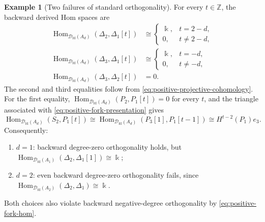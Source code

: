 \documentclass[11pt,a4paper]{article}
\newcommand{\D}{\mathcal D}
\newcommand{\ZZ}{\mathbb{Z}}
\newcommand{\std}{\Delta}
\DeclareMathOperator{\fd}{fd}
\DeclareMathOperator{\Hom}{Hom}
\theoremstyle{plain}
\theoremstyle{definition}
\newtheorem{example}[theorem]{Example}
\numberwithin{equation}{section}
\begin{document}
\begin{example}[Two failures of standard orthogonality]
For every $t\in\ZZ$, the backward derived Hom spaces are
\begin{equation}\label{eq:positive-fork-hom}
 \begin{aligned}
 \Hom_{\D_{\fd}(A_d)}(\std_2,\std_1[t])
   &\cong\begin{cases}\Bbbk,&t=2-d,\\0,&t\neq2-d,\end{cases}\\
 \Hom_{\D_{\fd}(A_d)}(\std_3,\std_1[t])
   &\cong\begin{cases}\Bbbk,&t=-d,\\0,&t\neq-d,\end{cases}\\
 \Hom_{\D_{\fd}(A_d)}(\std_3,\std_2[t])&=0.
 \end{aligned}
\end{equation}
The second and third equalities follow from
\eqref{eq:positive-projective-cohomology}. For the first equality,
$\Hom_{\D_{\fd}(A_d)}(P_2,P_1[t])=0$ for every $t$, and the triangle
associated with \eqref{eq:positive-fork-presentation} gives
\begin{equation}\label{eq:positive-fork-calculation}
 \Hom_{\D_{\fd}(A_d)}(S_2,P_1[t])
 \cong\Hom_{\D_{\fd}(A_d)}(P_3[1],P_1[t-1])
 \cong H^{t-2}(P_1)e_3.
\end{equation}
Consequently:
\begin{enumerate}[label=\textup{(\roman*)}]
 \item $d=1$: backward degree-zero orthogonality holds, but
 $\Hom_{\D_{\fd}(A_1)}(\std_2,\std_1[1])\cong\Bbbk$;
 \item $d=2$: even backward degree-zero orthogonality fails,
 since $\Hom_{\D_{\fd}(A_2)}(\std_2,\std_1)\cong\Bbbk$.
\end{enumerate}
Both choices also violate backward negative-degree orthogonality
by \eqref{eq:positive-fork-hom}.
\end{example}
\end{document}
